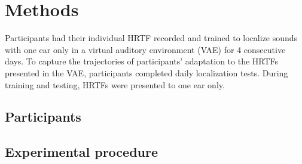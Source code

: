 %
%

\section{\label{sec:2} Methods}

Participants had their individual HRTF recorded and trained to localize sounds
with one ear only in a virtual auditory environment (VAE) for 4 consecutive
days. To capture the trajectories of participants' adaptation to the HRTFs
presented in the VAE, participants completed daily localization tests. During
training and testing, HRTFs were presented to one ear only.


\subsection{Participants}

\subsection{Experimental procedure}

